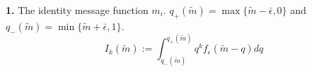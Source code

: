 \documentclass{article}
\begin{document}
\noindent\textbf{1.} The identity message function $m_{i}$. $q_{+}(\tilde{m})=\max\{\tilde{m}-\bar{\epsilon},0\}$ and $q_{-}(\tilde{m})=\min\{\tilde{m}+\bar{\epsilon},1\}$. 
\begin{equation}
I_{k}(\tilde{m}):=\int_{q_{-}(\tilde{m})}^{q_{+}(\tilde{m})}{q^{k}f_{\epsilon}(\tilde{m}-q)dq}
\end{equation}
\end{document}
